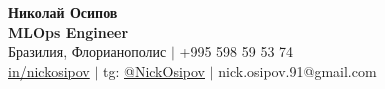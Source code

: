 \documentclass[letterpaper,12pt,english,russian]{fed-res} %
\begin{document}
\begin{center}
    \textbf{\Huge Николай Осипов} \\ \vspace{1pt}
    \textbf{MLOps Engineer} \\ \vspace{1pt}
    Бразилия, Флорианополис $|$ +995 598 59 53 74 \\ \vspace{1pt}  
    \href{https://www.linkedin.com/in/nickosipov/}{in/nickosipov} $|$ tg: \href{https://t.me/NickOsipov}{@NickOsipov} $|$ nick.osipov.91@gmail.com \\ \vspace{1pt}
\end{center}







\end{document}
